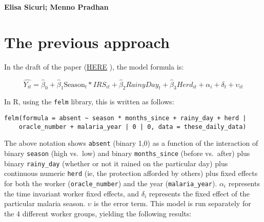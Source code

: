 \documentclass[]{article}
\begin{document}
\textbf{Elisa Sicuri; Menno Pradhan}

\vspace{3mm}

\newpage

\section{The previous approach}\label{the-previous-approach}

In the draft of the paper
(\href{https://docs.google.com/document/d/1bUWRBCgVcgjSPHchIQxiTG8Vwv5hV1GLU4Tlu386sWA/edit#}{HERE}
), the model formula is:

\[
\hat{Y_{it}} = \hat{\beta}_{0} +  \hat{\beta}_{1}\text{Season}_{t} * IRS_{it} + \hat{\beta}_2{RainyDay_{t}} + \hat{\beta}_3{Herd_{it}} +  \alpha_i + \delta_t + \upsilon_{it}
\]

In R, using the \texttt{felm} library, this is written as follows:

\begin{verbatim}
felm(formula = absent ~ season * months_since + rainy_day + herd | 
    oracle_number + malaria_year | 0 | 0, data = these_daily_data)
\end{verbatim}

The above notation shows \texttt{absent} (binary 1,0) as a function of
the interaction of binary \texttt{season} (high vs.~low) and binary
\texttt{months\_since} (before vs.~after) plus binary
\texttt{rainy\_day} (whether or not it rained on the particular day)
plus continuous numeric \texttt{herd} (ie, the protection afforded by
others) plus fixed effects for both the worker (\texttt{oracle\_number})
and the year (\texttt{malaria\_year}). \(\alpha_i\) represents the time
invariant worker fixed effects, and \(\delta_i\) represents the fixed
effect of the particular malaria season. \(\upsilon\) is the error term.
This model is run separately for the 4 different worker groups, yielding
the following results:
\end{document}
